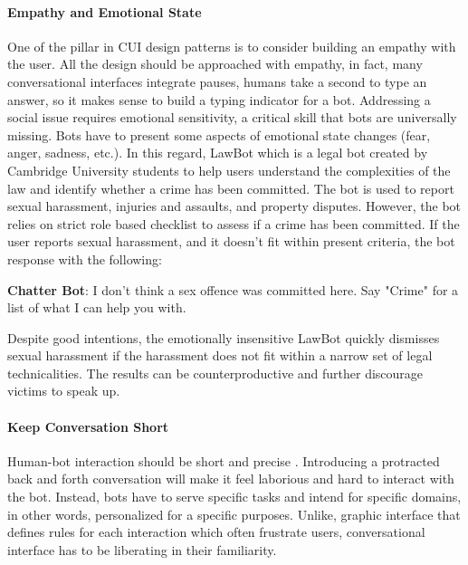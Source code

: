 \paragraph{Empathy and Emotional State}
One of the pillar in CUI design patterns is to consider building an empathy with the user. All the design should be approached with empathy, in fact, many conversational interfaces integrate pauses, humans take a second to type an answer, so it makes sense to build a typing indicator for a bot. Addressing a social issue requires emotional sensitivity, a critical skill that bots are universally missing. Bots have to present some aspects of emotional state changes (fear, anger, sadness, etc.). In this regard, LawBot \cite{lawbot} which is a legal bot created by Cambridge University students to help users understand the complexities of the law and identify whether a crime has been committed. The bot is used to report sexual harassment, injuries and assaults, and property disputes. However, the bot relies on strict role based checklist to assess if a crime has been committed. If the user reports sexual harassment, and it doesn't fit within present criteria, the bot response with the following:
\bigskip

{ \selectfont

  \color{red}
  \textbf{Chatter Bot}:  I don’t think a sex offence was committed here. Say "Crime" for a list of what I can help you with.
  \bigskip
  
  \color{black}
}

Despite good intentions, the emotionally insensitive LawBot quickly dismisses sexual harassment if the harassment does not fit within a narrow set of legal technicalities. The results can be counterproductive and further discourage victims to speak up.


\paragraph{Keep Conversation Short}
Human-bot interaction should be short and precise \cite{fadhil2018}. Introducing a protracted back and forth conversation will make it feel laborious and hard to interact with the bot. Instead, bots have to serve specific tasks and intend for specific domains, in other words, personalized for a specific purposes. Unlike, graphic interface that defines rules for each interaction which often frustrate users, conversational interface has to be liberating in their familiarity.

